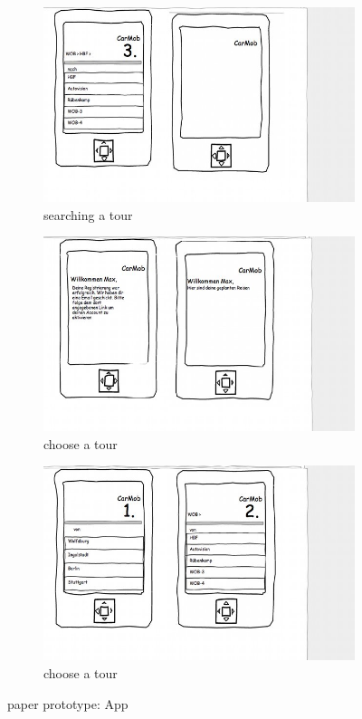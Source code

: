 \begin{figure}[!h]
	\begin{subfigure}[b]{0.3\textwidth}
		\centering
		\includegraphics[width=\textwidth]{images/App_4.jpg}
		\caption{searching a tour}
		\label{fig:app1}
	\end{subfigure}
	\begin{subfigure}[b]{0.3\textwidth}
		\centering
		\includegraphics[width=\textwidth]{images/App_2.jpg}
		\caption{choose a tour}
		\label{fig:app2}
	\end{subfigure}
		\begin{subfigure}[b]{0.3\textwidth}
		\centering
		\includegraphics[width=\textwidth]{images/App_3.jpg}
		\caption{choose a tour}
		\label{fig:app3}
	\end{subfigure}
	\caption{paper prototype: App}
	\label{fig:app}
\end{figure}

